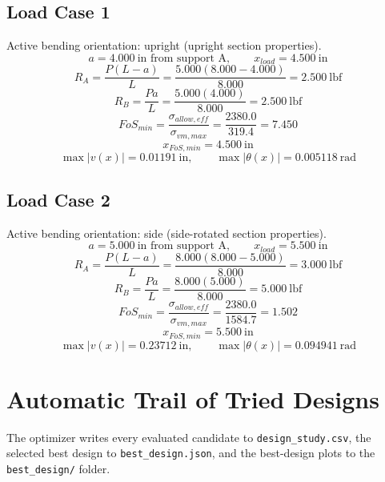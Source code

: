 \documentclass[11pt]{article}
\begin{document}
\subsection*{Load Case 1}
Active bending orientation: upright (upright section properties).
\[a = 4.000\ \mathrm{in} \text{ from support A}, \qquad x_{load} = 4.500\ \mathrm{in}\]
\[R_A = \frac{P(L-a)}{L} = \frac{5.000(8.000-4.000)}{8.000} = 2.500\ \mathrm{lbf}\]
\[R_B = \frac{Pa}{L} = \frac{5.000(4.000)}{8.000} = 2.500\ \mathrm{lbf}\]
\[FoS_{min} = \frac{\sigma_{allow,eff}}{\sigma_{vm,max}} = \frac{2380.0}{319.4} = 7.450\]
\[x_{FoS,min} = 4.500\ \mathrm{in}\]
\[\max |v(x)| = 0.01191\ \mathrm{in}, \qquad \max |\theta(x)| = 0.005118\ \mathrm{rad}\]
\subsection*{Load Case 2}
Active bending orientation: side (side-rotated section properties).
\[a = 5.000\ \mathrm{in} \text{ from support A}, \qquad x_{load} = 5.500\ \mathrm{in}\]
\[R_A = \frac{P(L-a)}{L} = \frac{8.000(8.000-5.000)}{8.000} = 3.000\ \mathrm{lbf}\]
\[R_B = \frac{Pa}{L} = \frac{8.000(5.000)}{8.000} = 5.000\ \mathrm{lbf}\]
\[FoS_{min} = \frac{\sigma_{allow,eff}}{\sigma_{vm,max}} = \frac{2380.0}{1584.7} = 1.502\]
\[x_{FoS,min} = 5.500\ \mathrm{in}\]
\[\max |v(x)| = 0.23712\ \mathrm{in}, \qquad \max |\theta(x)| = 0.094941\ \mathrm{rad}\]

\section*{Automatic Trail of Tried Designs}
The optimizer writes every evaluated candidate to \texttt{design\_study.csv}, the selected best design to \texttt{best\_design.json}, and the best-design plots to the \texttt{best\_design/} folder.
\end{document}
